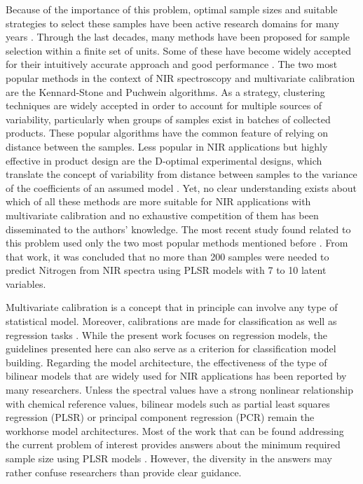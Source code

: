\documentclass[journal=ancham,manuscript=article]{achemso}
\begin{document}
Because of the importance of this problem, optimal sample sizes and suitable strategies to select these samples have been active research domains for many years \cite{Ferre1996,Au2020, Liu2019}. Through the last decades, many methods have been proposed for sample selection within a finite set of units. Some of these have become widely accepted for their intuitively accurate approach and good performance \cite{Shetty2012a, Nawar2018, He2015}. The two most popular methods in the context of NIR spectroscopy and multivariate calibration are the Kennard-Stone\cite{Kennard1969} and  Puchwein\cite{Puchwein1988} algorithms. As a strategy, clustering techniques are widely accepted in order to account for multiple sources of variability\cite{Naes1990}, particularly when groups of samples exist in batches of collected products\cite{Bobelyn2010}. These popular algorithms have the common feature of relying on distance between the samples. Less popular in NIR applications but highly effective in product design are the D-optimal experimental designs, which translate the concept of variability from distance between samples to the variance of the coefficients of an assumed model \cite{Goos2011}. Yet, no clear understanding exists about which of all these methods are more suitable for NIR applications with multivariate calibration and no exhaustive competition of them has been disseminated to the authors' knowledge. The most recent study found related to this problem used only the two most popular methods mentioned before \cite{Au2020}. From that work, it was concluded that no more than 200 samples were needed to predict Nitrogen from NIR spectra using PLSR models with 7 to 10 latent variables.

Multivariate calibration is a concept that in principle can involve any type of statistical model. Moreover, calibrations are made for classification as well as regression tasks \cite{Saeys2019}. While the present work focuses on regression models, the guidelines presented here can also serve as a criterion for classification model building. Regarding the model architecture, the effectiveness of the type of bilinear models that are widely used for NIR applications has been reported by many researchers. Unless the spectral values have a strong nonlinear relationship with chemical reference values, bilinear models such as partial least squares regression (PLSR) or principal component regression (PCR) remain the workhorse model architectures. Most of the work that can be found addressing the current problem of interest provides answers about the minimum required sample size using PLSR models \cite{Naes1990, Au2020, Shetty2012a, Rodionova2008}. However, the diversity in the answers may rather confuse researchers than provide clear guidance. 
\end{document}
